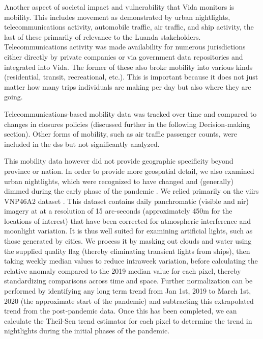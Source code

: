 Another aspect of societal impact and vulnerability that Vida monitors is mobility. This includes movement as demonstrated by urban nightlights, telecommunications activity, automobile traffic, air traffic, and ship activity, the last of these primarily of relevance to the Luanda stakeholders. Telecommunications activity was made availability for numerous jurisdictions either directly by private companies \cite{googleCOVID19CommunityMobility} or via government data repositories \cite{ministeriodecienciatecnologiaconocimientoeinnovacionDatosCOVID192021} and integrated into Vida. The former of these also broke mobility into various kinds (residential, transit, recreational, etc.). This is important because it does not just matter how many trips individuals are making per day but also where they are going.

Telecommunications-based mobility data was tracked over time and compared to changes in closures policies (discussed further in the following Decision-making section). Other forms of mobility, such as air traffic passenger counts, were included in the \ac{dss} but not significantly analyzed.

This mobility data however did not provide geographic specificity beyond province or nation. In order to provide more geospatial detail, we also examined urban nightlights, which were recognized to have changed and (generally) dimmed during the early phase of the pandemic \cite{elvidgeDimmingLightsChina2020}. We relied primarily on the \ac{viirs} VNP46A2 dataset \cite{romanNASABlackMarble2018}. This dataset contains daily panchromatic (visible and \ac{nir}) imagery at at a resolution of 15 arc-seconds (approximately 450m for the locations of interest) that have been corrected for atmospheric interference and moonlight variation. It is thus well suited for examining artificial lights, such as those generated by cities. We process it by masking out clouds and water using the supplied quality flag (thereby eliminating transient lights from ships), then taking weekly median values to reduce intraweek variation, before calculating the relative anomaly compared to the 2019 median value for each pixel, thereby standardizing comparisons across time and space. Further normalization can be performed by identifying any long term trend from Jan 1st, 2019 to March 1st, 2020 (the approximate start of the pandemic) and subtracting this extrapolated trend from the post-pandemic data. Once this has been completed, we can calculate the Theil-Sen trend estimator for each pixel to determine the trend in nightlights during the initial phases of the pandemic.

